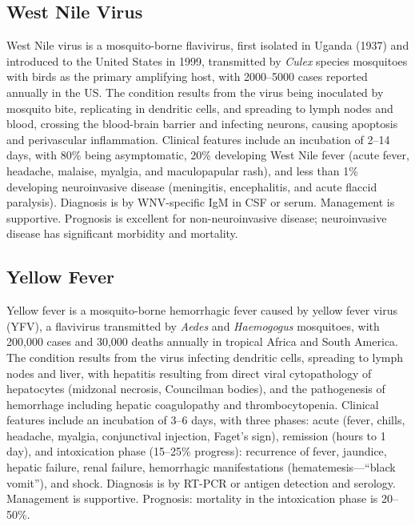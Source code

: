 \subsection{West Nile Virus}
\label{sec:West Nile Virus}
West Nile virus is a mosquito-borne flavivirus, first isolated in Uganda (1937) and introduced to the United States in 1999, transmitted by \textit{Culex} species mosquitoes with birds as the primary amplifying host, with 2000--5000 cases reported annually in the US. The condition results from the virus being inoculated by mosquito bite, replicating in dendritic cells, and spreading to lymph nodes and blood, crossing the blood-brain barrier and infecting neurons, causing apoptosis and perivascular inflammation. Clinical features include an incubation of 2--14 days, with 80\% being asymptomatic, 20\% developing West Nile fever (acute fever, headache, malaise, myalgia, and maculopapular rash), and less than 1\% developing neuroinvasive disease (meningitis, encephalitis, and acute flaccid paralysis). Diagnosis is by WNV-specific IgM in CSF or serum. Management is supportive. Prognosis is excellent for non-neuroinvasive disease; neuroinvasive disease has significant morbidity and mortality.

\subsection{Yellow Fever}
\label{sec:Yellow Fever}
Yellow fever is a mosquito-borne hemorrhagic fever caused by yellow fever virus (YFV), a flavivirus transmitted by \textit{Aedes} and \textit{Haemogogus} mosquitoes, with 200,000 cases and 30,000 deaths annually in tropical Africa and South America. The condition results from the virus infecting dendritic cells, spreading to lymph nodes and liver, with hepatitis resulting from direct viral cytopathology of hepatocytes (midzonal necrosis, Councilman bodies), and the pathogenesis of hemorrhage including hepatic coagulopathy and thrombocytopenia. Clinical features include an incubation of 3--6 days, with three phases: acute (fever, chills, headache, myalgia, conjunctival injection, Faget's sign), remission (hours to 1 day), and intoxication phase (15--25\% progress): recurrence of fever, jaundice, hepatic failure, renal failure, hemorrhagic manifestations (hematemesis---``black vomit''), and shock. Diagnosis is by RT-PCR or antigen detection and serology. Management is supportive. Prognosis: mortality in the intoxication phase is 20--50\%.

